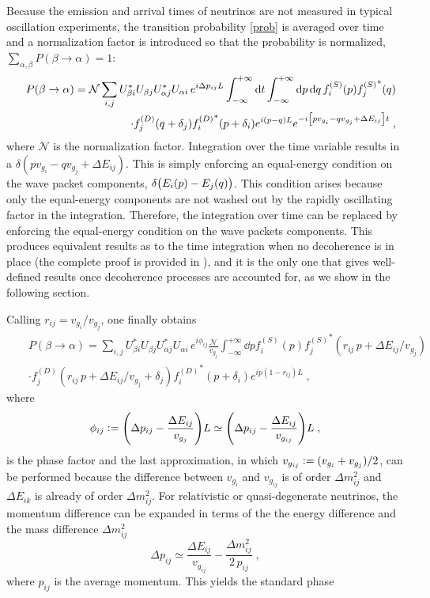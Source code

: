 \documentclass[11pt]{article}
\newcommand{\ebd}{\vcentcolon =}
\newcommand{\inttt}[1]{\int_{-\infty}^{+\infty}\dd{#1}}
\begin{document}
Because the emission and arrival times of neutrinos are not measured in typical oscillation experiments, the transition probability \eqref{prob} is averaged over time \cite{Akhmedov:2009rb} and a normalization factor is introduced so that the probability is normalized, $\sum_{\alpha,\beta} P(\beta\to \alpha) = 1$:
\begin{eqnarray}\label{probbb}
    &&P(\beta\to\alpha) = \mathcal{N}\sum_{i,j} U^*_{\beta i} U_{\beta j} U^*_{\alpha j} U_{\alpha i} \,e^{i\Delta p_{ij}L} \inttt{t}\int_{-\infty}^{+\infty}\text{d}{p}\,\text{d}{q}\,f_i^{(S)}(p){f_j^{(S)}}^*(q) \nonumber \\ &&\cdot f_j^{(D)}(q+\delta_j) {f_i^{(D)}}^*(p+\delta_i) e^{i(p-q)L} e^{-i\qty[pv_{g_i}-qv_{g_j}+\Delta E_{ij}]t}\;,
\end{eqnarray}
where $\mathcal{N}$ is the normalization factor. Integration over the time variable results in a  $\delta(pv_{g_i}-qv_{g_j}+\Delta E_{ij})$. This is simply enforcing an equal-energy condition on the wave packet components, $\delta\qty(E_i(p)-E_j(q))$. This condition arises because only the equal-energy components are not washed out  by the rapidly oscillating factor in the integration. Therefore,  the integration over  time  can be replaced by enforcing the equal-energy condition on the wave packets components. This produces equivalent results as to the time integration when no decoherence is in place (the complete proof is provided in \cite{PhDVittorio}), and it is the only one that gives well-defined results  once decoherence processes are accounted for, as we show in the following section. 

Calling $r_{ij}=v_{g_i}/v_{g_j}$, one finally obtains
\begin{eqnarray}
    &&P(\beta\to\alpha) = \sum_{i,j} U^*_{\beta i} U_{\beta j} U^*_{\alpha j} U_{\alpha i} \,e^{i \phi_{ij}} \frac{\mathcal{N}}{v_{g_j}}\inttt{p} f_i^{(S)}(p) {f_j^{(S)}}^*(r_{ij}\,p+\Delta E_{ij}/v_{g_j}) \nonumber \\ &&\cdot f_j^{(D)}(r_{ij}\,p+\Delta E_{ij}/v_{g_j}+\delta_j) {f_i^{(D)}}^*(p+\delta_i) e^{ip(1-r_{ij})L}\;,\label{oscillation probability standard wave-packet final}
\end{eqnarray}
where
\begin{equation}
    \phi_{ij} \ebd \qty(\Delta p_{ij}-\frac{\Delta E_{ij}}{v_{g_j}})L \simeq  \qty(\Delta p_{ij}-\frac{\Delta E_{ij}}{v_{g_{ij}}})L\;,
\end{equation}
is the phase factor and the last approximation, in which $v_{g_{ij}} \ebd (v_{g_i}+v_{g_j})/2$, can be performed because the difference between $v_{g_i}$ and $v_{g_{ij}}$ is of order $\Delta m^2_{ij}$ and $\Delta E_{ik}$ is already of order $\Delta m^2_{ij}$. For relativistic or quasi-degenerate neutrinos, the momentum difference can be expanded in terms of the the energy difference and the mass difference $\Delta m^2_{ij}$
\begin{equation}
    \Delta p_{ij} \simeq \frac{\Delta E_{ij}}{v_{g_{ij}}} - \frac{\Delta m^2_{ij}}{2\,p_{ij}}\;,
\end{equation}
where $p_{ij}$ is the average momentum. This yields the standard phase
\end{document}
